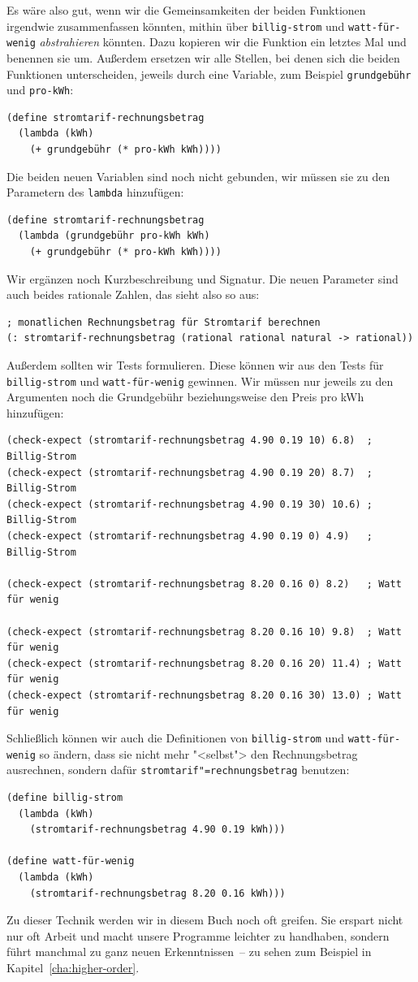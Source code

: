 Es wäre also gut, wenn wir die Gemeinsamkeiten der beiden Funktionen
irgendwie zusammenfassen könnten, mithin über \texttt{billig-strom}
und \texttt{watt-für-wenig} \textit{abstrahieren}
könnten.  Dazu kopieren wir die Funktion ein letztes Mal und benennen
sie um.  Außerdem ersetzen wir alle Stellen, bei denen sich die beiden
Funktionen unterscheiden, jeweils durch eine Variable, zum Beispiel
\texttt{grundgebühr} und \texttt{pro-kWh}:
%
\begin{verbatim}
(define stromtarif-rechnungsbetrag
  (lambda (kWh)
    (+ grundgebühr (* pro-kWh kWh))))
\end{verbatim}
%
Die beiden neuen Variablen sind noch nicht gebunden, wir müssen sie zu
den Parametern des \texttt{lambda} hinzufügen:
%
\begin{verbatim}
(define stromtarif-rechnungsbetrag
  (lambda (grundgebühr pro-kWh kWh)
    (+ grundgebühr (* pro-kWh kWh))))
\end{verbatim}
%
Wir ergänzen noch Kurzbeschreibung und Signatur.  Die neuen Parameter
sind auch beides rationale Zahlen, das sieht also so aus:
%
\begin{verbatim}
; monatlichen Rechnungsbetrag für Stromtarif berechnen
(: stromtarif-rechnungsbetrag (rational rational natural -> rational))
\end{verbatim}
%
Außerdem sollten wir Tests formulieren.  Diese können wir aus den
Tests für \texttt{billig-strom} und \texttt{watt-für-wenig} gewinnen.
Wir müssen nur jeweils zu den Argumenten noch die Grundgebühr
beziehungsweise den Preis pro kWh hinzufügen:
%
\begin{verbatim}
(check-expect (stromtarif-rechnungsbetrag 4.90 0.19 10) 6.8)  ; Billig-Strom
(check-expect (stromtarif-rechnungsbetrag 4.90 0.19 20) 8.7)  ; Billig-Strom
(check-expect (stromtarif-rechnungsbetrag 4.90 0.19 30) 10.6) ; Billig-Strom
(check-expect (stromtarif-rechnungsbetrag 4.90 0.19 0) 4.9)   ; Billig-Strom

(check-expect (stromtarif-rechnungsbetrag 8.20 0.16 0) 8.2)   ; Watt für wenig

(check-expect (stromtarif-rechnungsbetrag 8.20 0.16 10) 9.8)  ; Watt für wenig
(check-expect (stromtarif-rechnungsbetrag 8.20 0.16 20) 11.4) ; Watt für wenig
(check-expect (stromtarif-rechnungsbetrag 8.20 0.16 30) 13.0) ; Watt für wenig
\end{verbatim}
%
Schließlich können wir auch die Definitionen von \texttt{billig-strom}
und \texttt{watt-für-wenig} so ändern, dass sie nicht mehr "<selbst">
den Rechnungsbetrag ausrechnen, sondern dafür
\texttt{stromtarif"=rechnungsbetrag} benutzen:
%
\begin{verbatim}
(define billig-strom
  (lambda (kWh)
    (stromtarif-rechnungsbetrag 4.90 0.19 kWh)))

(define watt-für-wenig
  (lambda (kWh)
    (stromtarif-rechnungsbetrag 8.20 0.16 kWh)))
\end{verbatim}
%
Zu dieser Technik werden wir in diesem Buch noch oft greifen.  Sie
erspart nicht nur oft Arbeit und macht unsere Programme leichter zu
handhaben, sondern führt manchmal zu ganz neuen Erkenntnissen~--
zu sehen zum Beispiel in Kapitel~\ref{cha:higher-order}.

